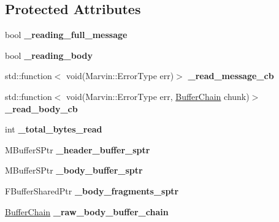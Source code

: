 \subsection*{Protected Attributes}
\begin{DoxyCompactItemize}
\item 
\mbox{\label{class_message_reader_abb038487edc35f1ab52dda94905f12bf}} 
bool {\bfseries \+\_\+reading\+\_\+full\+\_\+message}
\item 
\mbox{\label{class_message_reader_a4f8033980198ae323904b1da61e04018}} 
bool {\bfseries \+\_\+reading\+\_\+body}
\item 
\mbox{\label{class_message_reader_a163ab2d455cc0309604eba34d98899fd}} 
std\+::function$<$ void(Marvin\+::\+Error\+Type err)$>$ {\bfseries \+\_\+read\+\_\+message\+\_\+cb}
\item 
\mbox{\label{class_message_reader_aafcafdb0a110e408fded627d6adb0437}} 
std\+::function$<$ void(Marvin\+::\+Error\+Type err, \hyperlink{class_buffer_chain}{Buffer\+Chain} chunk)$>$ {\bfseries \+\_\+read\+\_\+body\+\_\+cb}
\item 
\mbox{\label{class_message_reader_a2143042814a1309829b81b6e291c515a}} 
int {\bfseries \+\_\+total\+\_\+bytes\+\_\+read}
\item 
\mbox{\label{class_message_reader_a98f9607368a080b35b7d30659dfe69fa}} 
M\+Buffer\+S\+Ptr {\bfseries \+\_\+header\+\_\+buffer\+\_\+sptr}
\item 
\mbox{\label{class_message_reader_a6b71ff33548f957df6c314802af2fcd9}} 
M\+Buffer\+S\+Ptr {\bfseries \+\_\+body\+\_\+buffer\+\_\+sptr}
\item 
\mbox{\label{class_message_reader_a3411525f143e9e0ed3a072db10734f08}} 
F\+Buffer\+Shared\+Ptr {\bfseries \+\_\+body\+\_\+fragments\+\_\+sptr}
\item 
\mbox{\label{class_message_reader_ad12c7c3612b1bc785b36a3640ac1b859}} 
\hyperlink{class_buffer_chain}{Buffer\+Chain} {\bfseries \+\_\+raw\+\_\+body\+\_\+buffer\+\_\+chain}

\end{DoxyCompactItemize}
